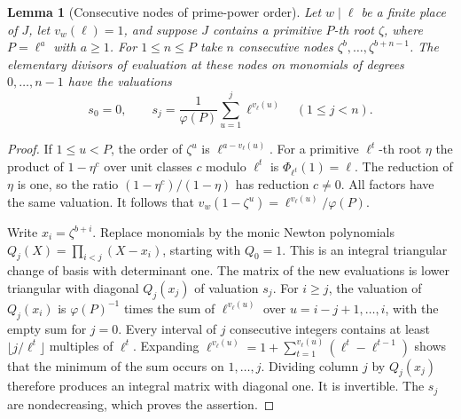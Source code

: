 \documentclass[a4paper,11pt]{article}
\newtheorem{lemma}[proposition]{Lemma}
\theoremstyle{definition}
\theoremstyle{remark}
\numberwithin{equation}{section}
\begin{document}
\begin{lemma}[Consecutive nodes of prime-power order]\leavevmode
\label{lem:scalarnodes432}
Let \(w\mid\ell\) be a finite place of \(J\), let
\(v_w(\ell)=1\), and suppose \(J\) contains a primitive
\(P\)-th root \(\zeta\), where \(P=\ell^a\) with \(a\ge1\).
For \(1\le n\le P\) take \(n\) consecutive nodes
\(\zeta^b,\ldots,\zeta^{b+n-1}\). The elementary divisors
of evaluation at these nodes on monomials of degrees
\(0,\ldots,n-1\) have the valuations
\[
     s_0=0,\qquad
     s_j=\frac{1}{\varphi(P)}\sum_{u=1}^j\ell^{v_\ell(u)}
                                 \quad(1\le j<n).
\]
\end{lemma}
\begin{proof}
If \(1\le u<P\), the order of \(\zeta^u\) is
\(\ell^{a-v_\ell(u)}\). For a primitive \(\ell^t\)-th root
\(\eta\) the product of \(1-\eta^c\) over unit classes \(c\)
modulo \(\ell^t\) is \(\Phi_{\ell^t}(1)=\ell\).
The reduction of \(\eta\) is one, so the ratio
\((1-\eta^c)/(1-\eta)\) has reduction \(c\ne0\).
All factors have the same valuation. It follows that
\(v_w(1-\zeta^u)=\ell^{v_\ell(u)}/\varphi(P)\).

Write \(x_i=\zeta^{b+i}\). Replace monomials by the monic
Newton polynomials \(Q_j(X)=\prod_{i<j}(X-x_i)\), starting
with \(Q_0=1\). This is an integral triangular change of basis
with determinant one. The matrix of the new evaluations is
lower triangular with diagonal \(Q_j(x_j)\) of valuation \(s_j\).
For \(i\ge j\), the valuation of \(Q_j(x_i)\) is
\(\varphi(P)^{-1}\) times the sum of \(\ell^{v_\ell(u)}\)
over \(u=i-j+1,\ldots,i\), with the empty sum for \(j=0\).
Every interval of \(j\) consecutive integers contains at least
\(\lfloor j/\ell^t\rfloor\) multiples of \(\ell^t\). Expanding
\(\ell^{v_\ell(u)}=1+\sum_{t=1}^{v_\ell(u)}
(\ell^t-\ell^{t-1})\) shows that the minimum of the sum occurs
on \(1,\ldots,j\). Dividing column \(j\) by \(Q_j(x_j)\)
therefore produces an integral matrix with diagonal one.
It is invertible. The \(s_j\) are nondecreasing, which proves
the assertion.
\end{proof}
\end{document}
